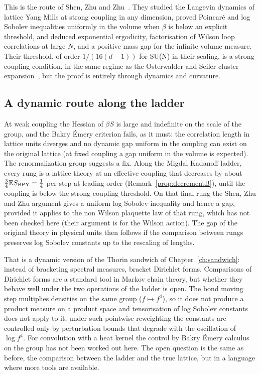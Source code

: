This is the route of Shen, Zhu and Zhu~\cite{SZZ}. They studied the Langevin dynamics of lattice Yang Mills at strong coupling in any dimension, proved Poincar\'e and log Sobolev inequalities uniformly in the volume when $\beta$ is below an explicit threshold, and deduced exponential ergodicity, factorisation of Wilson loop correlations at large $N$, and a positive mass gap for the infinite volume measure. Their threshold, of order $1/(16(d-1))$ for SU(N) in their scaling, is a strong coupling condition, in the same regime as the Osterwalder and Seiler cluster expansion~\cite{OSe}, but the proof is entirely through dynamics and curvature.

\subsection{A dynamic route along the ladder}

At weak coupling the Hessian of $\beta S$ is large and indefinite on the scale of the group, and the Bakry \'Emery criterion fails, as it must: the correlation length in lattice units diverges and no dynamic gap uniform in the coupling can exist on the original lattice (at fixed coupling a gap uniform in the volume is expected). The renormalization group suggests a fix. Along the Migdal Kadanoff ladder, every rung is a lattice theory at an effective coupling that decreases by about $\frac34\mathbb{E} S_{\mathrm{BPY}}=\frac14$ per step at leading order (Remark~\ref{prop:decrementB}), until the coupling is below the strong coupling threshold. On that final rung the Shen, Zhu and Zhu argument gives a uniform log Sobolev inequality and hence a gap, provided it applies to the non Wilson plaquette law of that rung, which has not been checked here (their argument is for the Wilson action). The gap of the original theory in physical units then follows if the comparison between rungs preserves log Sobolev constants up to the rescaling of lengths.

That is a dynamic version of the Thorin sandwich of Chapter~\ref{ch:sandwich}: instead of bracketing spectral measures, bracket Dirichlet forms. Comparisons of Dirichlet forms are a standard tool in Markov chain theory, but whether they behave well under the two operations of the ladder is open. The bond moving step multiplies densities on the same group ($f\mapsto f^4$), so it does not produce a product measure on a product space and tensorisation of log Sobolev constants does not apply to it; under such pointwise reweighting the constants are controlled only by perturbation bounds that degrade with the oscillation of $\log f^4$. For convolution with a heat kernel the control by Bakry \'Emery calculus on the group has not been worked out here. The open question is the same as before, the comparison between the ladder and the true lattice, but in a language where more tools are available.

